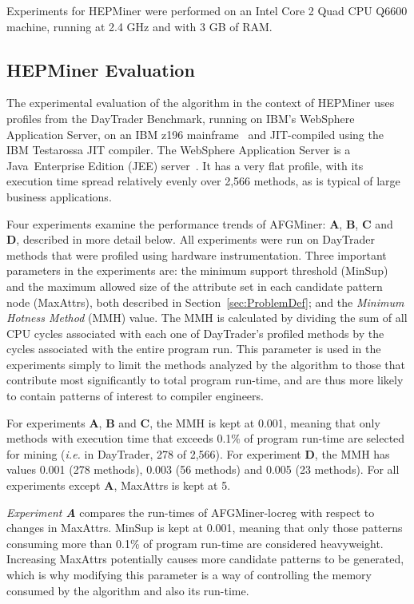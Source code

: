 Experiments for HEPMiner were performed on an Intel Core 2 Quad CPU Q6600 machine, running at 2.4 GHz and with 3 GB of RAM.

\subsection{HEPMiner Evaluation}
The experimental evaluation of the algorithm in the context of HEPMiner uses profiles from the DayTrader Benchmark, running on IBM's WebSphere Application Server, on an IBM z196 mainframe~\cite{zEnterprise} and JIT-compiled using the IBM Testarossa JIT compiler. The WebSphere Application Server is a Java\textregistered~Enterprise Edition (JEE) server~\cite{WAS}. It has a very flat profile, with its execution time spread relatively evenly over 2,566 methods, as is typical of large business applications.

Four experiments examine the performance trends of AFGMiner: {\bf A}, {\bf B}, {\bf C} and {\bf D}, described in more detail below. All experiments were run on DayTrader methods that were profiled using hardware instrumentation. Three important parameters in the experiments are: the minimum support threshold (MinSup) and the maximum allowed size of the attribute set in each candidate pattern node (MaxAttrs), both described in Section~\ref{sec:ProblemDef}; and the \emph{Minimum Hotness Method} (MMH) value. The MMH is calculated by dividing the sum of all CPU cycles associated with each one of DayTrader's profiled methods by the cycles associated with the entire program run. This parameter is used in the experiments simply to limit the methods analyzed by the algorithm to those that contribute most significantly to total program run-time, and are thus more likely to contain patterns of interest to compiler engineers. 

For experiments {\bf A}, {\bf B} and {\bf C}, the MMH is kept at 0.001, meaning that only methods with execution time that exceeds 0.1\% of program run-time are selected for mining (\emph{i.e.} in DayTrader, 278 of 2,566). For experiment {\bf D}, the MMH has values 0.001 (278 methods), 0.003 (56 methods) and 0.005 (23 methods). For all experiments except {\bf A}, MaxAttrs is kept at 5.

\emph{Experiment {\bf A}} compares the run-times of AFGMiner-locreg with respect to changes in MaxAttrs. MinSup is kept at 0.001, meaning that only those patterns consuming more than 0.1\% of program run-time are considered heavyweight. Increasing MaxAttrs potentially causes more candidate patterns to be generated, which is why modifying this parameter is a way of controlling the memory consumed by the algorithm and also its run-time. 

